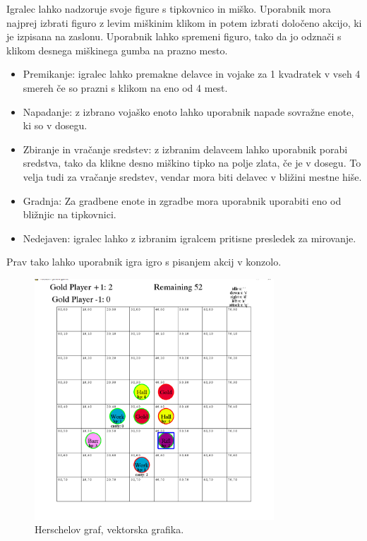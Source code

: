 \documentclass[a4paper, 12pt]{book}
\begin{document}
Igralec lahko nadzoruje svoje figure s tipkovnico in miško.
Uporabnik mora najprej izbrati figuro z levim miškinim klikom in potem izbrati določeno akcijo, ki je izpisana na zaslonu. Uporabnik lahko spremeni figuro, tako da jo odznači s klikom desnega miškinega gumba na prazno mesto.

\begin{itemize}
	\item Premikanje: igralec lahko premakne delavce in vojake za 1 kvadratek v vseh 4 smereh če so prazni s klikom na eno od 4 mest.
	\item Napadanje: z izbrano vojaško enoto lahko uporabnik napade sovražne enote, ki so v dosegu.
	\item Zbiranje in vračanje sredstev: z izbranim delavcem lahko uporabnik porabi sredstva, tako da klikne desno miškino tipko na polje zlata, če je v dosegu. To velja tudi za vračanje sredstev, vendar mora biti delavec v bližini mestne hiše.
	\item Gradnja: Za gradbene enote in zgradbe mora uporabnik uporabiti eno od bližnjic na tipkovnici.
	\item Nedejaven: igralec lahko z izbranim igralcem pritisne presledek za mirovanje.
\end{itemize}

Prav tako lahko uporabnik igra igro s pisanjem akcij v konzolo.

\begin{figure}[h]
	\begin{center}
		\includegraphics[width=0.8\textwidth]{visualization_pygame.pdf}
	\end{center}
	\caption{Herschelov graf, vektorska grafika.}
	\label{visualization_pygame}
\end{figure}
\end{document}
